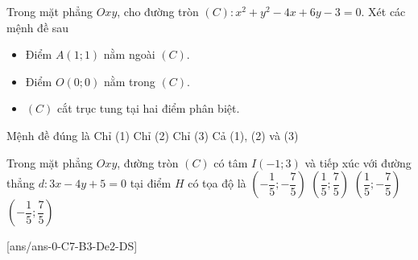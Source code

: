 \begin{ex}%
	Trong mặt phẳng $Oxy$, cho đường tròn $(C)\colon x^2+y^2-4x+6y-3=0$. Xét các mệnh đề sau
	\begin{itemize}
		\item[(1)] Điểm $A(1;1)$ nằm ngoài $(C)$.
		\item[(2)] Điểm $O(0;0)$ nằm trong $(C)$.
		\item[(3)] $(C)$ cắt trục tung tại hai điểm phân biệt.
	\end{itemize}
	Mệnh đề đúng là
	\choice
	{Chỉ (1)}
	{Chỉ (2)}
	{Chỉ (3)}
	{\True Cả (1), (2) và (3)}
\end{ex}
\begin{ex}%
	Trong mặt phẳng $Oxy$, đường tròn $(C)$ có tâm $I(-1;3)$ và tiếp xúc với đường thẳng $d\colon  3x-4y+5=0$ tại điểm $H$ có tọa độ là
	\choice
	{$\left(-\dfrac{1}{5};-\dfrac{7}{5} \right)$}
	{\True $\left(\dfrac{1}{5};\dfrac{7}{5} \right)$}
	{$\left(\dfrac{1}{5};-\dfrac{7}{5} \right)$}
	{$\left(-\dfrac{1}{5};\dfrac{7}{5} \right)$}
\end{ex}

\cauds
{}[ans/ans-0-C7-B3-De2-DS]

